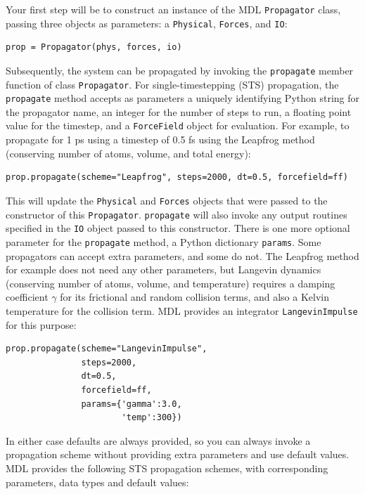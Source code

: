 \documentclass[11pt]{report}
\begin{document}
Your first step will be to construct an instance of the MDL
\texttt{Propagator} class, passing three objects as parameters:
a \texttt{Physical}, \texttt{Forces}, and \texttt{IO}:

\begin{verbatim}
prop = Propagator(phys, forces, io)
\end{verbatim}

Subsequently, the system can be propagated by invoking the 
\texttt{propagate} member function of class \texttt{Propagator}.
For single-timestepping (STS) propagation, the \texttt{propagate}
method accepts as parameters a uniquely identifying Python
string for the propagator name, an integer for the number of
steps to run, a floating point value for the timestep, and
a \texttt{ForceField} object for evaluation.  For example,
to propagate for 1 ps using a timestep of 0.5 fs using the
Leapfrog \cite{HoEa81} method (conserving number of atoms,
volume, and total energy):

\begin{verbatim}
prop.propagate(scheme="Leapfrog", steps=2000, dt=0.5, forcefield=ff)
\end{verbatim}

This will update the \texttt{Physical} and \texttt{Forces} objects
that were passed to the constructor of this \texttt{Propagator}.
\texttt{propagate} will also invoke any output routines specified
in the \texttt{IO} object passed to this constructor. There is one more
optional parameter for the \texttt{propagate} method, a Python dictionary
\texttt{params}.  Some propagators can accept extra parameters, and
some do not.  The Leapfrog method for example does not need any
other parameters, but Langevin dynamics (conserving number of
atoms, volume, and temperature) requires a damping coefficient
\begin{math}\gamma\end{math} for its frictional and random collision terms, 
and also a Kelvin temperature for the collision term.  MDL provides
an integrator \texttt{LangevinImpulse} \cite{SkIz02} for this purpose:

\begin{verbatim}
prop.propagate(scheme="LangevinImpulse", 
               steps=2000, 
               dt=0.5, 
               forcefield=ff,
               params={'gamma':3.0,
                       'temp':300})
\end{verbatim}


In either case defaults are always provided, so
you can always invoke a propagation scheme without providing extra
parameters and use default values.  MDL provides the following STS
propagation schemes, with corresponding parameters, data types
and default values:
\end{document}
